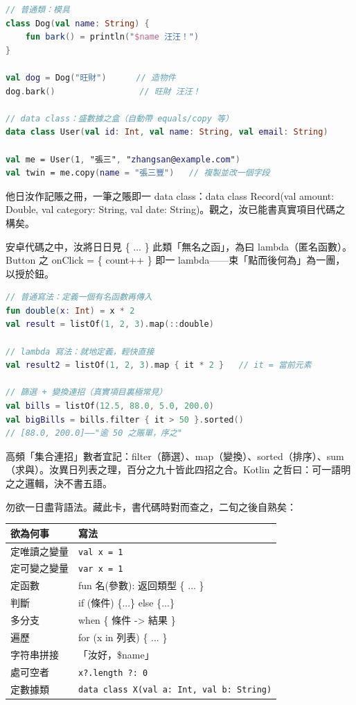 \begin{lstlisting}[language=Kotlin]
// 普通類：模具
class Dog(val name: String) {
    fun bark() = println("$name 汪汪！")
}

val dog = Dog("旺財")      // 造物件
dog.bark()                 // 旺財 汪汪！

// data class：盛數據之盒（自動帶 equals/copy 等）
data class User(val id: Int, val name: String, val email: String)

val me = User(1, "張三", "zhangsan@example.com")
val twin = me.copy(name = "張三豐")   // 複製並改一個字段
\end{lstlisting}

他日汝作記賬之冊，一筆之賬即一 data class：data class Record(val amount: Double, val category: String, val date: String)。觀之，汝已能書真實項目代碼之構矣。


安卓代碼之中，汝將日日見 \{ ... \} 此類「無名之函」，為曰 lambda（匿名函數）。Button 之 onClick = \{ count++ \} 即一 lambda——束「點而後何為」為一團，以授於鈕。

\begin{lstlisting}[language=Kotlin]
// 普通寫法：定義一個有名函數再傳入
fun double(x: Int) = x * 2
val result = listOf(1, 2, 3).map(::double)

// lambda 寫法：就地定義，輕快直接
val result2 = listOf(1, 2, 3).map { it * 2 }   // it = 當前元素

// 篩選 + 變換連招（真實項目裏極常見）
val bills = listOf(12.5, 88.0, 5.0, 200.0)
val bigBills = bills.filter { it > 50 }.sorted()
// [88.0, 200.0]——"逾 50 之賬單，序之"
\end{lstlisting}

高頻「集合連招」數者宜記：filter（篩選）、map（變換）、sorted（排序）、sum（求與）。汝異日列表之理，百分之九十皆此四招之合。Kotlin 之哲曰：可一語明之之邏輯，決不書五語。


勿欲一日盡背語法。藏此卡，書代碼時對而查之，二旬之後自熟矣：

\begin{center}
\begin{tabularx}{\linewidth}{|X|X|}
\hline
\textbf{欲為何事} & \textbf{寫法} \tabularnewline
\hline
定唯讀之變量 & \texttt{val x = 1} \tabularnewline
定可變之變量 & \texttt{var x = 1} \tabularnewline
定函數 & fun 名(參數): 返回類型 \{ ... \} \tabularnewline
判斷 & if (條件) \{...\} else \{...\} \tabularnewline
多分支 & when \{ 條件 -> 結果 \} \tabularnewline
遍歷 & for (x in 列表) \{ ... \} \tabularnewline
字符串拼接 & 「汝好，\$name」 \tabularnewline
處可空者 & \texttt{x?.\allowbreak length ?: 0} \tabularnewline
定數據類 & \texttt{data class X(val a: Int, val b: String)} \tabularnewline
\hline
\end{tabularx}
\end{center}

